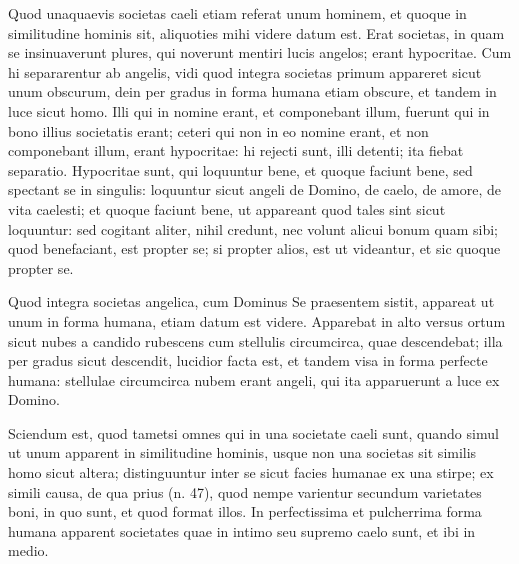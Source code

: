 
\begin{topic}{68}
    Quod unaquaevis societas caeli etiam referat unum hominem, et quoque in similitudine hominis sit, aliquoties mihi
    videre datum est.
    Erat societas, in quam se insinuaverunt plures, qui noverunt mentiri lucis angelos; erant hypocritae.
    Cum hi separarentur ab angelis, vidi quod integra societas primum appareret sicut unum obscurum, dein per gradus in
    forma humana etiam obscure, et tandem in luce sicut homo.
    Illi qui in nomine erant, et componebant illum, fuerunt qui in bono illius societatis erant; ceteri qui non in eo
    nomine erant, et non componebant illum, erant hypocritae: hi rejecti sunt, illi detenti; ita fiebat separatio.
    Hypocritae sunt, qui loquuntur bene, et quoque faciunt bene, sed spectant se in singulis: loquuntur sicut angeli de
    Domino, de caelo, de amore, de vita caelesti; et quoque faciunt bene, ut appareant quod tales sint sicut loquuntur:
    sed cogitant aliter, nihil credunt, nec volunt alicui bonum quam sibi; quod benefaciant, est propter se; si propter
    alios, est ut videantur, et sic quoque propter se.
\end{topic}

\begin{topic}{69}
    Quod integra societas angelica, cum Dominus Se praesentem sistit, appareat ut unum in forma humana, etiam datum est
    videre.
    Apparebat in alto versus ortum sicut nubes a candido rubescens cum stellulis circumcirca, quae descendebat; illa per
    gradus sicut descendit, lucidior facta est, et tandem visa in forma perfecte humana: stellulae circumcirca nubem
    erant angeli, qui ita apparuerunt a luce ex Domino.
\end{topic}

\begin{topic}{70}
    Sciendum est, quod tametsi omnes qui in una societate caeli sunt, quando simul ut unum apparent in similitudine
    hominis, usque non una societas sit similis homo sicut altera; distinguuntur inter se sicut facies humanae ex una
    stirpe; ex simili causa, de qua prius (n. 47), quod nempe varientur secundum varietates boni, in quo sunt, et quod
    format illos.
    In perfectissima et pulcherrima forma humana apparent societates quae in intimo seu supremo caelo sunt, et ibi in
    medio.
\end{topic}

